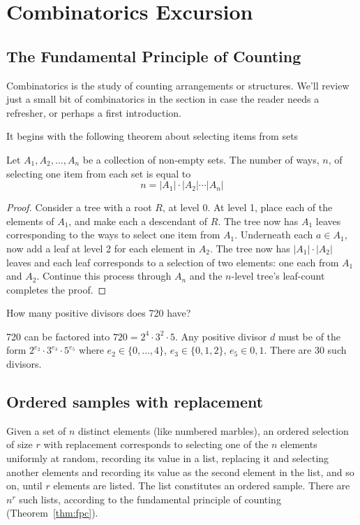 \documentclass[../main.tex]{subfiles}
\begin{document}
\section{Combinatorics Excursion}
\subsection{The Fundamental Principle of Counting}
Combinatorics is the study of counting arrangements or structures. We'll 
review just a small bit of combinatorics in the section in case the
reader needs a refresher, or perhaps a first introduction.

It begins with the following theorem about selecting items from sets
\begin{theorem}
	Let $A_1, A_2, \ldots, A_n$ be a collection of non-empty sets. The
	number of ways, $n$, of selecting one item from each set is equal to
	$$n = |A_1| \cdot |A_2| \cdots |A_n|$$
	\label{thm:fpc}
\end{theorem}

\begin{proof}
	Consider a tree with a root $R$, at level 0. At level 1, place
	each of the elements of $A_1$, and make each a descendant of $R$. The tree
	now has $A_1$ leaves corresponding to the ways to select one item from $A_1$. 
	Underneath each $a \in A_1$, now add a leaf at level 2 for each element in $A_2$. The tree
	now has $|A_1| \cdot |A_2|$ leaves and each leaf corresponds to a selection of two elements: one each from $A_1$ and $A_2$. Continue this process through $A_n$ and
	the $n$-level tree's leaf-count completes the proof.
\end{proof}

\begin{example}
	How many positive divisors does 720 have?
\end{example}
\begin{solution}
	720 can be factored into $720 = 2^4 \cdot 3^2 \cdot 5$. Any positive divisor $d$ must
	be of the form $2^{e_2}\cdot 3^{e_3}\cdot 5^{e_5}$ where $e_2 \in \{0,\ldots,4\}$,
	$e_3 \in \{0,1,2\}$, $e_5 \in {0,1}$. There are 30 such divisors.
\end{solution}

\subsection{Ordered samples with replacement}
Given a set of $n$ distinct elements (like numbered marbles), an
ordered selection of size $r$ with replacement corresponds to selecting
one of the $n$ elements uniformly at random, recording its value in a list,
replacing it and selecting another elements and recording its value as the 
second element in the list, and so on, until $r$ elements are listed. The list
constitutes an ordered sample. There are $n^r$ such lists, according to
the fundamental principle of counting (Theorem~\ref{thm:fpc}).
\end{document}
